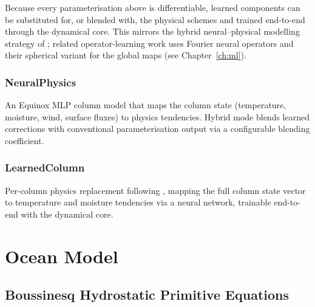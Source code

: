 \documentclass[11pt,twoside]{report}
\begin{document}
Because every parameterisation above is differentiable, learned components can
be substituted for, or blended with, the physical schemes and trained
end-to-end through the dynamical core. This mirrors the hybrid neural--physical
modelling strategy of \citet{Kochkov2024}; related operator-learning work uses
Fourier neural operators \citep{Li2021} and their spherical variant
\citep{Bonev2023} for the global maps (see Chapter~\ref{ch:ml}).

\subsection{NeuralPhysics}
An Equinox MLP column model that maps the column state (temperature, moisture, wind, surface fluxes) to physics tendencies.  Hybrid mode blends learned corrections with conventional parameterisation output via a configurable blending coefficient.

\subsection{LearnedColumn}
Per-column physics replacement following \citet{Rasp2018}, mapping the full column state vector to temperature and moisture tendencies via a neural network, trainable end-to-end with the dynamical core.


\chapter{Ocean Model}
\label{ch:ocean}

\section{Boussinesq Hydrostatic Primitive Equations}
\end{document}
